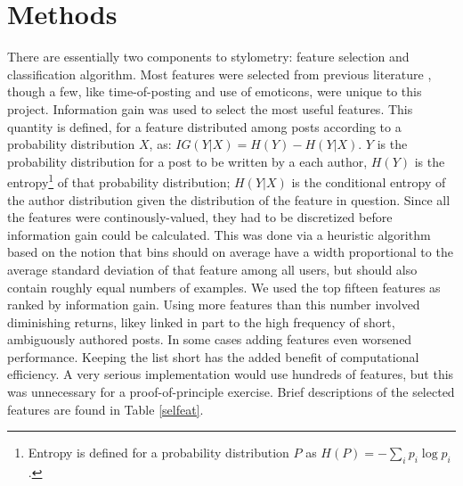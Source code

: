 \documentclass[12pt,letterpaper,onecolumn,oneside]{article}
\numberwithin{equation}{section}
\numberwithin{figure}{section}
\begin{document}
\section{Methods}
There are essentially two components to stylometry: feature selection and classification algorithm. Most features were selected from previous literature \cite{anonymouth,stanford}, though a few, like 
time-of-posting and use of emoticons, were unique to this project. Information gain was used to select the most useful features. This quantity is defined, for a feature distributed among posts according to a 
probability distribution \(X\), as: \(IG(Y|X) = H(Y) - H(Y|X)\). \(Y\) is the probability distribution for a post to be written by a each author, \(H(Y)\) is the entropy\footnote{Entropy is defined for a probability 
distribution \(P\) as \(H(P) = -\sum_i p_i \log{p_i}\).} of that probability distribution; \(H(Y|X)\) is the conditional entropy of the author distribution given the distribution of the feature in question. Since all 
the features were continously-valued, they had to be discretized before information gain could be calculated. This was done via a heuristic algorithm based on the notion that bins should on average have a width 
proportional to the average standard deviation of that feature among all users, but should also contain roughly equal numbers of examples. We used the top fifteen features as ranked by information gain. Using more 
features than this number involved diminishing returns, likey linked in part to the high frequency of short, ambiguously authored posts. In some cases adding features even worsened performance. Keeping the list short 
has the added benefit of computational efficiency. A very serious implementation would use hundreds of features, but this was unnecessary for a proof-of-principle exercise. Brief descriptions of the selected features 
are found in Table \ref{selfeat}.
\end{document}
